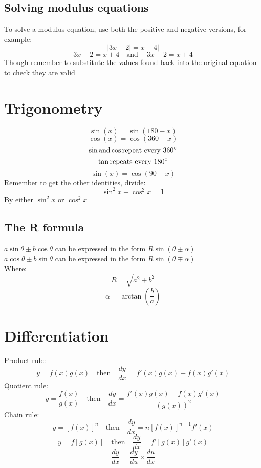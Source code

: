 \documentclass{article}[18pt]
\begin{document}
\subsection{Solving modulus equations}
To solve a modulus equation, use both the positive and negative versions, for example:
$$|3x-2|=x+4|$$
$$3x-2=x+4 \quad \textrm{and} -3x+2=x+4$$
Though remember to substitute the values found back into the original equation to check they are valid
\section{Trigonometry}
$$\sin(x)=\sin(180-x)$$
$$\cos(x)=\cos(360-x)$$
$$\sin \textrm{and} \cos \textrm{repeat every 360}\degree$$
$$\tan \textrm{repeats every 180}\degree$$
$$\sin(x)=\cos(90-x)$$
Remember to get the other identities, divide:
$$\sin^2x+\cos^2x=1$$
By either $\sin^2x$ or $\cos^2x$
\subsection{The R formula}
$a\sin\theta\pm b\cos\theta$ can be expressed in the form $R\sin(\theta\pm\alpha)$\\
$a\cos\theta\pm b\sin\theta$ can be expressed in the form $R\sin(\theta\mp\alpha)$\\
Where: 
$$R = \sqrt{a^2+b^2}$$
$$\alpha=\arctan(\frac{b}{a})$$
\newpage
\section{Differentiation}
Product rule:
$$y=f(x)g(x)\quad \textrm{then} \quad\frac{dy}{dx}=f'(x)g(x)+f(x)g'(x)$$
Quotient rule:
$$y=\frac{f(x)}{g(x)} \quad \textrm{then} \quad\frac{dy}{dx}=\frac{f'(x)g(x)-f(x)g'(x)}{(g(x))^2}$$
Chain rule:
$$y=[f(x)]^n \quad \textrm{then} \quad \frac{dy}{dx}=n[f(x)]^{n-1}f'(x)$$
$$y=f[g(x)] \quad \textrm{then} \quad \frac{dy}{dx}=f'[g(x)]g'(x)$$
$$\frac{dy}{dx}=\frac{dy}{du}\times\frac{du}{dx}$$
\end{document}
